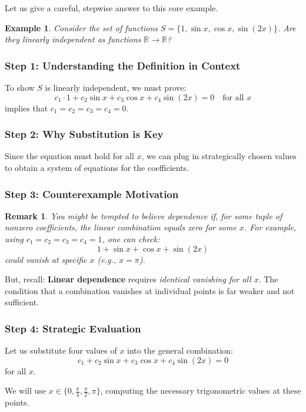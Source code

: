 \documentclass[12pt]{article}
\newtheorem{remark}[theorem]{Remark}
\newtheorem{example}[theorem]{Example}
\begin{document}
Let us give a careful, stepwise answer to this core example.

\begin{example}
\label{example:sinecos}
Consider the set of functions $S = \{1, \sin x, \cos x, \sin(2x)\}$. Are they linearly independent as functions $\mathbb{R} \to \mathbb{R}$?
\end{example}

\subsubsection*{Step 1: Understanding the Definition in Context}
To show $S$ is linearly independent, we must prove:
\[
c_1 \cdot 1 + c_2 \sin x + c_3 \cos x + c_4 \sin(2x) = 0 \quad \text{for all } x
\]
implies that $c_1 = c_2 = c_3 = c_4 = 0$.

\subsubsection*{Step 2: Why Substitution is Key}
Since the equation must hold for all $x$, we can plug in strategically chosen values to obtain a system of equations for the coefficients.

\subsubsection*{Step 3: Counterexample Motivation}
\begin{remark}
You might be tempted to believe dependence if, for some tuple of nonzero coefficients, the linear combination equals zero for \textit{some} $x$. For example, using $c_1 = c_2 = c_3 = c_4 = 1$, one can check:
\[
1 + \sin x + \cos x + \sin(2x)
\]
could vanish at specific $x$ (e.g., $x = \pi$).
\end{remark}

But, recall: \textbf{Linear dependence} requires \emph{identical vanishing for all $x$}. The condition that a combination vanishes at individual points is far weaker and not sufficient.

\subsubsection*{Step 4: Strategic Evaluation}
Let us substitute four values of $x$ into the general combination:
\[
c_1 + c_2 \sin x + c_3 \cos x + c_4 \sin(2x) = 0
\]
for all $x$.

We will use $x \in \{0, \frac{\pi}{4}, \frac{\pi}{2}, \pi\}$, computing the necessary trigonometric values at these points.
\end{document}
